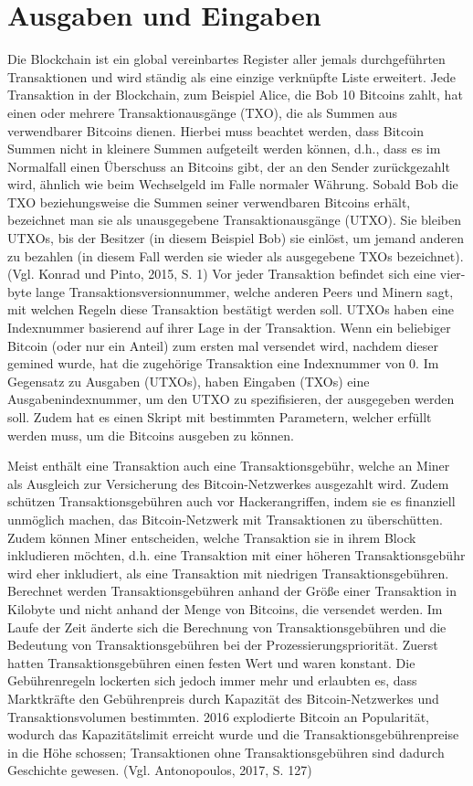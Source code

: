 \section{Ausgaben und Eingaben}
Die Blockchain ist ein global vereinbartes Register aller jemals durchgeführten Transaktionen und wird ständig als eine einzige 
verknüpfte Liste erweitert. Jede Transaktion in der Blockchain, zum Beispiel Alice, die Bob 10 Bitcoins zahlt, hat einen oder
mehrere Transaktionausgänge (TXO), die als Summen aus verwendbarer Bitcoins dienen. Hierbei muss beachtet werden, dass Bitcoin
Summen nicht in kleinere Summen aufgeteilt werden können, d.h., dass es im Normalfall einen Überschuss an Bitcoins gibt, der an 
den Sender zurückgezahlt wird, ähnlich wie beim Wechselgeld im Falle normaler Währung. Sobald Bob die TXO beziehungsweise 
die Summen seiner verwendbaren Bitcoins erhält, bezeichnet man sie als unausgegebene Transaktionausgänge (UTXO). Sie bleiben
UTXOs, bis der Besitzer (in diesem Beispiel Bob) sie einlöst, um jemand anderen zu bezahlen (in diesem Fall werden sie wieder
als ausgegebene TXOs bezeichnet). (Vgl. Konrad und Pinto, 2015, S. 1) Vor jeder Transaktion befindet sich eine vier-byte lange
Transaktionsversionnummer, welche anderen Peers und Minern sagt, mit welchen Regeln diese Transaktion bestätigt werden soll.
UTXOs haben eine Indexnummer basierend auf ihrer Lage in der Transaktion. Wenn ein beliebiger Bitcoin (oder nur ein Anteil)
zum ersten mal versendet wird, nachdem dieser gemined wurde, hat die zugehörige Transaktion eine Indexnummer von 0. Im Gegensatz
zu Ausgaben (UTXOs), haben Eingaben (TXOs) eine Ausgabenindexnummer, um den UTXO zu spezifisieren, der ausgegeben werden soll.
Zudem hat es einen Skript mit bestimmten Parametern, welcher erfüllt werden muss, um die Bitcoins ausgeben zu können.

Meist enthält eine Transaktion auch eine Transaktionsgebühr, welche an Miner als Ausgleich zur Versicherung des Bitcoin-Netzwerkes
ausgezahlt wird. Zudem schützen Transaktionsgebühren auch vor Hackerangriffen, indem sie es finanziell unmöglich machen, das 
Bitcoin-Netzwerk mit Transaktionen zu überschütten. Zudem können Miner entscheiden, welche Transaktion sie in ihrem Block
inkludieren möchten, d.h. eine Transaktion mit einer höheren Transaktionsgebühr wird eher inkludiert, als eine Transaktion mit
niedrigen Transaktionsgebühren. Berechnet werden Transaktionsgebühren anhand der Größe einer Transaktion in Kilobyte und nicht 
anhand der Menge von Bitcoins, die versendet werden. Im Laufe der Zeit änderte sich die Berechnung von Transaktionsgebühren
und die Bedeutung von Transaktionsgebühren bei der Prozessierungspriorität. Zuerst hatten Transaktionsgebühren einen festen 
Wert und waren konstant. Die Gebührenregeln lockerten sich jedoch immer mehr und erlaubten es, dass Marktkräfte den
Gebührenpreis durch Kapazität des Bitcoin-Netzwerkes und Transaktionsvolumen bestimmten. 2016 explodierte Bitcoin an Popularität,
wodurch das Kapazitätslimit erreicht wurde und die Transaktionsgebührenpreise in die Höhe schossen; Transaktionen ohne
Transaktionsgebühren sind dadurch Geschichte gewesen. (Vgl. Antonopoulos, 2017, S. 127)

